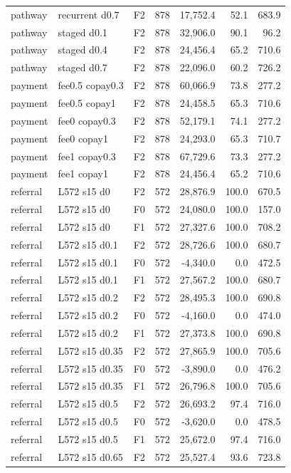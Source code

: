 \begin{longtable}{p{1.8cm}p{3.35cm}lrrrr}
pathway & recurrent d0.7 & F2 & 878 & 17,752.4 & 52.1 & 683.9\\
pathway & staged d0.1 & F2 & 878 & 32,906.0 & 90.1 & 96.2\\
pathway & staged d0.4 & F2 & 878 & 24,456.4 & 65.2 & 710.6\\
pathway & staged d0.7 & F2 & 878 & 22,096.0 & 60.2 & 726.2\\
payment & fee0.5 copay0.3 & F2 & 878 & 60,066.9 & 73.8 & 277.2\\
payment & fee0.5 copay1 & F2 & 878 & 24,458.5 & 65.3 & 710.6\\
payment & fee0 copay0.3 & F2 & 878 & 52,179.1 & 74.1 & 277.2\\
payment & fee0 copay1 & F2 & 878 & 24,293.0 & 65.3 & 710.7\\
payment & fee1 copay0.3 & F2 & 878 & 67,729.6 & 73.3 & 277.2\\
payment & fee1 copay1 & F2 & 878 & 24,456.4 & 65.2 & 710.6\\
referral & L572 s15 d0 & F2 & 572 & 28,876.9 & 100.0 & 670.5\\
referral & L572 s15 d0 & F0 & 572 & 24,080.0 & 100.0 & 157.0\\
referral & L572 s15 d0 & F1 & 572 & 27,327.6 & 100.0 & 708.2\\
referral & L572 s15 d0.1 & F2 & 572 & 28,726.6 & 100.0 & 680.7\\
referral & L572 s15 d0.1 & F0 & 572 & -4,340.0 & 0.0 & 472.5\\
referral & L572 s15 d0.1 & F1 & 572 & 27,567.2 & 100.0 & 680.7\\
referral & L572 s15 d0.2 & F2 & 572 & 28,495.3 & 100.0 & 690.8\\
referral & L572 s15 d0.2 & F0 & 572 & -4,160.0 & 0.0 & 474.0\\
referral & L572 s15 d0.2 & F1 & 572 & 27,373.8 & 100.0 & 690.8\\
referral & L572 s15 d0.35 & F2 & 572 & 27,865.9 & 100.0 & 705.6\\
referral & L572 s15 d0.35 & F0 & 572 & -3,890.0 & 0.0 & 476.2\\
referral & L572 s15 d0.35 & F1 & 572 & 26,796.8 & 100.0 & 705.6\\
referral & L572 s15 d0.5 & F2 & 572 & 26,693.2 & 97.4 & 716.0\\
referral & L572 s15 d0.5 & F0 & 572 & -3,620.0 & 0.0 & 478.5\\
referral & L572 s15 d0.5 & F1 & 572 & 25,672.0 & 97.4 & 716.0\\
referral & L572 s15 d0.65 & F2 & 572 & 25,527.4 & 93.6 & 723.8\\

\end{longtable}
